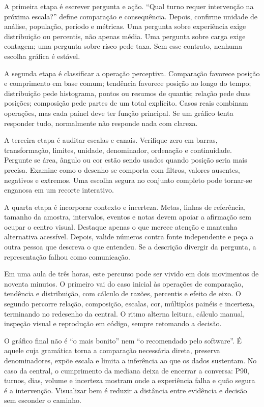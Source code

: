 A primeira etapa é escrever pergunta e ação. ``Qual turno requer intervenção na próxima escala?'' define comparação e consequência. Depois, confirme unidade de análise, população, período e métricas. Uma pergunta sobre experiência exige distribuição ou percentis, não apenas média. Uma pergunta sobre carga exige contagem; uma pergunta sobre risco pede taxa. Sem esse contrato, nenhuma escolha gráfica é estável.

A segunda etapa é classificar a operação perceptiva. Comparação favorece posição e comprimento em base comum; tendência favorece posição ao longo do tempo; distribuição pede histograma, pontos ou resumos de quantis; relação pede duas posições; composição pede partes de um total explícito. Casos reais combinam operações, mas cada painel deve ter função principal. Se um gráfico tenta responder tudo, normalmente não responde nada com clareza.

A terceira etapa é auditar escalas e canais. Verifique zero em barras, transformação, limites, unidade, denominador, ordenação e continuidade. Pergunte se área, ângulo ou cor estão sendo usados quando posição seria mais precisa. Examine como o desenho se comporta com filtros, valores ausentes, negativos e extremos. Uma escolha segura no conjunto completo pode tornar-se enganosa em um recorte interativo.

A quarta etapa é incorporar contexto e incerteza. Metas, linhas de referência, tamanho da amostra, intervalos, eventos e notas devem apoiar a afirmação sem ocupar o centro visual. Destaque apenas o que merece atenção e mantenha alternativa acessível. Depois, valide números contra fonte independente e peça a outra pessoa que descreva o que entendeu. Se a descrição divergir da pergunta, a representação falhou como comunicação.

Em uma aula de três horas, este percurso pode ser vivido em dois movimentos de noventa minutos. O primeiro vai do caso inicial às operações de comparação, tendência e distribuição, com cálculo de razões, percentis e efeito de eixo. O segundo percorre relação, composição, escalas, cor, múltiplos painéis e incerteza, terminando no redesenho da central. O ritmo alterna leitura, cálculo manual, inspeção visual e reprodução em código, sempre retomando a decisão.

O gráfico final não é ``o mais bonito'' nem ``o recomendado pelo software''. É aquele cuja gramática torna a comparação necessária direta, preserva denominadores, expõe escala e limita a inferência ao que os dados sustentam. No caso da central, o cumprimento da mediana deixa de encerrar a conversa: P90, turnos, dias, volume e incerteza mostram onde a experiência falha e quão segura é a intervenção. Visualizar bem é reduzir a distância entre evidência e decisão sem esconder o caminho.

